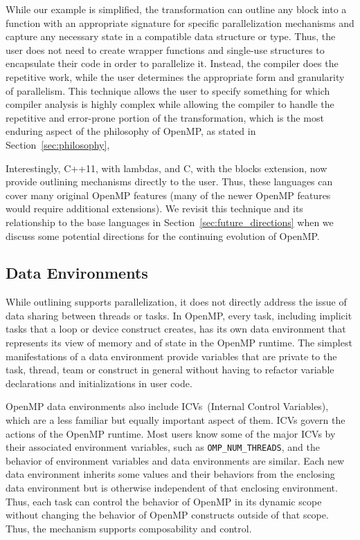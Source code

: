 While our example is simplified, the transformation can outline any block 
into a function with an appropriate signature for specific parallelization 
mechanisms and capture any necessary state in a compatible data structure 
or type. Thus, the user does not need to create wrapper functions and 
single-use structures to encapsulate their code in order to parallelize it. 
Instead, the compiler does the repetitive work, while the user determines the
appropriate form and granularity of parallelism. This technique allows 
the user to specify something for which compiler analysis is highly complex 
while allowing the compiler to handle the repetitive and error-prone 
portion of the transformation, which is the most enduring aspect of the 
philosophy of OpenMP, as stated in Section~\ref{sec:philosophy}, 

Interestingly, C++11, with lambdas, and C, with the blocks extension, now 
provide outlining mechanisms directly to the user. Thus, these languages
can cover many original OpenMP features (many of the newer OpenMP features
would require additional extensions). We revisit this technique and its
relationship to the base languages in Section~\ref{sec:future_directions} when
we discuss some potential directions for the continuing evolution of OpenMP.

\subsection{Data Environments}
\label{sub:data_environments}

While outlining supports parallelization, it does not directly address 
the issue of data sharing between threads or tasks. In OpenMP, every task, 
including implicit tasks that a loop or device construct creates, has its 
own data environment that represents its view of memory and of state in the 
OpenMP runtime. The simplest manifestations of a data environment provide 
variables that are private to the task, thread, team or construct in general 
without having to refactor variable declarations and initializations in 
user code.

OpenMP data environments also include ICVs~(Internal Control Variables),
which are a less familiar but equally important aspect of them. ICVs govern
the actions of the OpenMP runtime. Most users know some of the major ICVs by 
their associated environment variables, such as \texttt{OMP\_NUM\_THREADS}, 
and the behavior of environment variables and data environments are similar. 
Each new data environment inherits some values and their behaviors from the 
enclosing data environment but is otherwise independent of that enclosing 
environment. Thus, each task can control the behavior of OpenMP in its 
dynamic scope without changing the behavior of OpenMP constructs outside 
of that scope. Thus, the mechanism supports composability and control.

